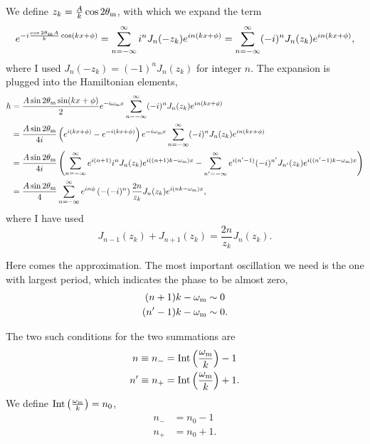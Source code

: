 We define $z_k = \frac{A}{k} \cos 2\theta_\mathrm m$, with which we expand the term
\begin{equation}
   e^{-i\frac{\cos 2\theta_\mathrm m A}{k} \cos (kx +\phi)} = \sum_{n=-\infty}^\infty i^n J_n (-z_k) e^{in (kx +\phi)} =  \sum_{n=-\infty}^\infty (-i)^n J_n (z_k) e^{in (kx +\phi)},
\end{equation}
where I used $J_n(-z_k) = (-1)^n J_n(z_k)$ for integer $n$.
The expansion is plugged into the Hamiltonian elements,
\begin{align}
   h &= \frac{A \sin 2\theta_\mathrm m \sin (kx + \phi)}{2} e^{-i\omega_\mathrm m x } \sum_{n = - \infty}^\infty (-i)^n J_n(z_k) e^{i n ( kx + \phi)} \\
   & = \frac{A\sin 2\theta_\mathrm m}{4i} \left( e^{i(kx + \phi)} - e^{-i(kx+\phi)} \right) e^{-i\omega_\mathrm m x } \sum_{n = - \infty}^\infty (-i)^n J_n(z_k) e^{i n ( kx + \phi)} \\
   & = \frac{A\sin 2\theta_\mathrm m}{4i} \left( \sum_{n=-\infty}^\infty e^{i(n+1)} i^n J_n (z_k) e^{i((n+1) k - \omega_\mathrm m)x}  - \sum_{n'=-\infty}^\infty e^{i(n'-1)} (-i)^{n'}J_{n'}(z_k) e^{i( (n'-1)k - \omega_\mathrm m)x}  \right)\\
   & = \frac{A\sin 2\theta_\mathrm m}{4} \sum_{n=-\infty}^{\infty} e^{in\phi} \left( - (-i)^n \right) \frac{2n}{z_k} J_n (z_k) e^{i(nk-\omega_\mathrm m)x},
\end{align}
where I have used
\begin{equation}
   J_{n-1}(z_k) + J_{n+1}(z_k) = \frac{2n}{z_k} J_n(z_k).
\end{equation}

Here comes the approximation. The most important oscillation we need is the one with largest period, which indicates the phase to be almost zero,
\begin{align}
   (n+1) k -\omega_\mm &\sim 0 \\
   (n'-1) k -\omega_\mm &\sim 0.
   \label{chap:matter-sec:deep-jacobi-subsec:single-matter-freq-eqn:single-frequency-rwa-requirement}
\end{align}

The two such conditions for the two summations are
\begin{align}
   n \equiv n_- &= \mathrm{Int}\left( \frac{\omega_\mathrm m}{k} \right) - 1 \\
   n' \equiv n_+ &= \mathrm{Int}\left( \frac{\omega_\mathrm m}{k} \right) + 1 .
\end{align}
We define $\mathrm{Int}\left( \frac{\omega_\mathrm m}{k} \right) = n_0$,
\begin{align}
   n_- &= n_0 - 1 \\
   n_+ &= n_0 + 1 .
\end{align}

